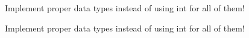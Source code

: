 
\begin{DoxyRefList}
\item[\label{todo__todo000001}%
\hypertarget{todo__todo000001}{}%
Class \hyperlink{structProcessInfoModule}{Process\+Info\+Module} ]Implement proper data types instead of using int for all of them!  
\item[\label{todo__todo000002}%
\hypertarget{todo__todo000002}{}%
Class \hyperlink{classSystemInfoModule}{System\+Info\+Module} ]Implement proper data types instead of using int for all of them! 
\end{DoxyRefList}